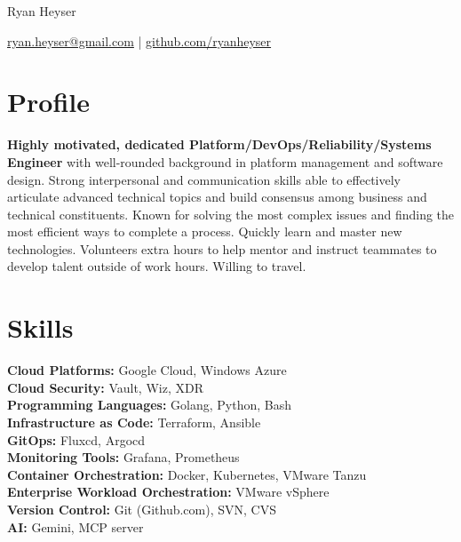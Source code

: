 \documentclass[11pt]{article}       %
\begin{document}
\centerline{\Huge Ryan Heyser}

\vspace{5pt}

\centerline{\href{mailto:ryan.heyser@gmail.com}{ryan.heyser@gmail.com} | \href{github.com/ryanheyser}{github.com/ryanheyser}}

\vspace{-10pt}

\section*{Profile}
\textbf{Highly motivated, dedicated Platform/DevOps/Reliability/Systems Engineer} with well-rounded background in platform management and software design. Strong interpersonal and communication skills able to effectively articulate advanced technical topics and build consensus among business and technical constituents. Known for solving the most complex issues and finding the most efficient ways to complete a process. Quickly learn and master new technologies. Volunteers extra hours to help mentor and instruct teammates to develop talent outside of work hours. Willing to travel. \\

\vspace{-6.5pt}

\section*{Skills}
\textbf{Cloud Platforms:} Google Cloud, Windows Azure \\
\textbf{Cloud Security:} Vault, Wiz, XDR \\
\textbf{Programming Languages:} Golang, Python, Bash \\
\textbf{Infrastructure as Code:} Terraform, Ansible \\
\textbf{GitOps:} Fluxcd, Argocd \\
\textbf{Monitoring Tools:} Grafana, Prometheus \\
\textbf{Container Orchestration:} Docker, Kubernetes, VMware Tanzu \\
\textbf{Enterprise Workload Orchestration:} VMware vSphere \\
\textbf{Version Control:} Git (Github.com), SVN, CVS \\
\textbf{AI:} Gemini, MCP server

\vspace{-6.5pt}
\end{document}
